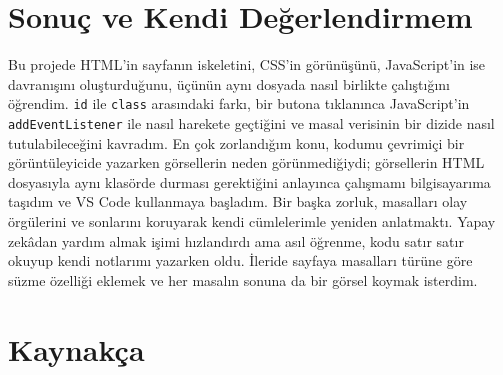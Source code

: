\documentclass[12pt,a4paper]{article}
\begin{document}
\section{Sonuç ve Kendi Değerlendirmem}

Bu projede HTML'in sayfanın iskeletini, CSS'in görünüşünü, JavaScript'in ise davranışını oluşturduğunu, üçünün aynı dosyada nasıl birlikte çalıştığını öğrendim. \texttt{id} ile \texttt{class} arasındaki farkı, bir butona tıklanınca JavaScript'in \texttt{addEventListener} ile nasıl harekete geçtiğini ve masal verisinin bir dizide nasıl tutulabileceğini kavradım. En çok zorlandığım konu, kodumu çevrimiçi bir görüntüleyicide yazarken görsellerin neden görünmediğiydi; görsellerin HTML dosyasıyla aynı klasörde durması gerektiğini anlayınca çalışmamı bilgisayarıma taşıdım ve VS Code kullanmaya başladım. Bir başka zorluk, masalları olay örgülerini ve sonlarını koruyarak kendi cümlelerimle yeniden anlatmaktı. Yapay zekâdan yardım almak işimi hızlandırdı ama asıl öğrenme, kodu satır satır okuyup kendi notlarımı yazarken oldu. İleride sayfaya masalları türüne göre süzme özelliği eklemek ve her masalın sonuna da bir görsel koymak isterdim.

\section{Kaynakça}
\end{document}

